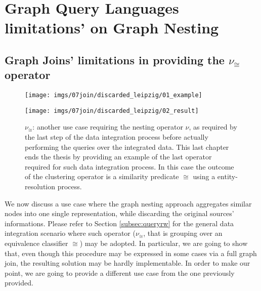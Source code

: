 \section{Graph Query Languages limitations’ on Graph Nesting}
\subsection{Graph Joins' limitations in providing the $\nu_\cong$ operator}\label{sec:whynotjoins}
\begin{figure}[!b]

\end{figure}

\begin{figure*}
	\begin{minipage}{\textwidth}
\centering
\texttt{[image: imgs/07join/discarded\_leipzig/01\_example]}
\label{fig:homog}
	\end{minipage}
	\begin{minipage}{\textwidth}

\centering
\texttt{[image: imgs/07join/discarded\_leipzig/02\_result]}
\label{fig:expresult}
\end{minipage}
\caption{$\nu_\cong$: another use case requiring the nesting operator $\nu$, as required by the last step of the data integration process before actually performing the queries over the integrated data. This last chapter ends the thesis by providing an example of the last operator required for such data integration process. In this case the outcome of the clustering operator is a similarity predicate $\cong$ using a entity-resolution process.}
\end{figure*}
We now discuss a use case where the graph nesting approach aggregates similar nodes into one single representation, while discarding the original sources' informations. Please refer to Section \vref{subsec:queryrw} for the general data integration scenario where such operator ($\nu_\cong$, that is grouping over an equivalence classifier $\cong$) may be adopted. In particular, we are going to show that, even though this procedure may be expressed in some cases via a full graph join, the resulting solution may be hardly implementable. In order to make our point, we are going to provide a different use case from the one previously provided.

